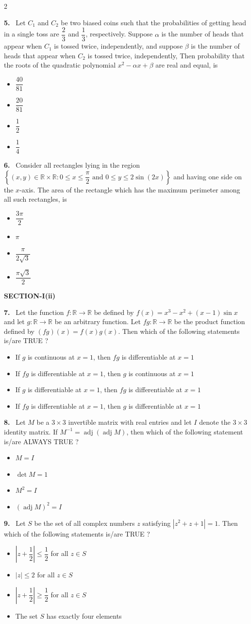 \documentclass[10pt]{extarticle}
\newcommand{\sect}[1]{\par\smallskip\noindent\textbf{#1}\par}
\newcommand{\qn}[1]{\par\smallskip\noindent\textbf{#1.}~}
\newenvironment{qoptions}{\begin{itemize}[leftmargin=1.8em,itemsep=1pt,topsep=2pt,label={}]}{\end{itemize}}
\newcommand{\opt}[2]{\item[(#1)] #2}
\begin{document}
\begin{multicols}{2}
\qn{5} Let $C_1$ and $C_2$ be two biased coins such that the probabilities of getting head in a single toss are $\dfrac23$ and $\dfrac13$, respectively. Suppose $\alpha$ is the number of heads that appear when $C_1$ is tossed twice, independently, and suppose $\beta$ is the number of heads that appear when $C_2$ is tossed twice, independently, Then probability that the roots of the quadratic polynomial $x^2-\alpha x+\beta$ are real and equal, is
\begin{qoptions}
\opt{A}{$\dfrac{40}{81}$}
\opt{B}{$\dfrac{20}{81}$}
\opt{C}{$\dfrac12$}
\opt{D}{$\dfrac14$}
\end{qoptions}

\qn{6} Consider all rectangles lying in the region $\left\{(x,y)\in\mathbb R\times\mathbb R:0\le x\le\dfrac\pi2\text{ and }0\le y\le2\sin(2x)\right\}$ and having one side on the $x$-axis. The area of the rectangle which has the maximum perimeter among all such rectangles, is
\begin{qoptions}
\opt{A}{$\dfrac{3\pi}2$}
\opt{B}{$\pi$}
\opt{C}{$\dfrac\pi{2\sqrt3}$}
\opt{D}{$\dfrac{\pi\sqrt3}2$}
\end{qoptions}

\sect{SECTION-I(ii)}
\qn{7} Let the function $f:\mathbb R\to\mathbb R$ be defined by $f(x)=x^3-x^2+(x-1)\sin x$ and let $g:\mathbb R\to\mathbb R$ be an arbitrary function. Let $fg:\mathbb R\to\mathbb R$ be the product function defined by $(fg)(x)=f(x)g(x)$. Then which of the following statements is/are TRUE ?
\begin{qoptions}
\opt{A}{If $g$ is continuous at $x=1$, then $fg$ is differentiable at $x=1$}
\opt{B}{If $fg$ is differentiable at $x=1$, then $g$ is continuous at $x=1$}
\opt{C}{If $g$ is differentiable at $x=1$, then $fg$ is differentiable at $x=1$}
\opt{D}{If $fg$ is differentiable at $x=1$, then $g$ is differentiable at $x=1$}
\end{qoptions}

\qn{8} Let $M$ be a $3\times3$ invertible matrix with real entries and let $I$ denote the $3\times3$ identity matrix. If $M^{-1}=\operatorname{adj}(\operatorname{adj}M)$, then which of the following statement is/are ALWAYS TRUE ?
\begin{qoptions}
\opt{A}{$M=I$}
\opt{B}{$\det M=1$}
\opt{C}{$M^2=I$}
\opt{D}{$(\operatorname{adj}M)^2=I$}
\end{qoptions}

\qn{9} Let $S$ be the set of all complex numbers $z$ satisfying $|z^2+z+1|=1$. Then which of the following statements is/are TRUE ?
\begin{qoptions}
\opt{A}{$\left|z+\dfrac12\right|\le\dfrac12$ for all $z\in S$}
\opt{B}{$|z|\le2$ for all $z\in S$}
\opt{C}{$\left|z+\dfrac12\right|\ge\dfrac12$ for all $z\in S$}
\opt{D}{The set $S$ has exactly four elements}
\end{qoptions}


\end{multicols}
\end{document}
